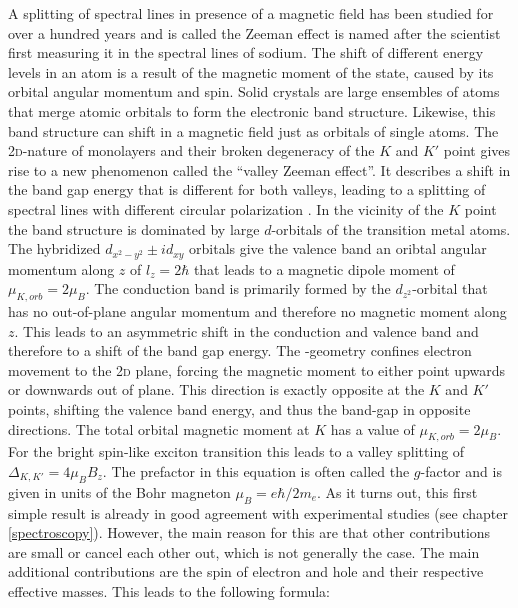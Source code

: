 A splitting of spectral lines in presence of a magnetic field has been studied for over a hundred years and is called the Zeeman effect is named after the scientist first measuring it in the spectral lines of sodium. The shift of different energy levels in an atom is a result of the magnetic moment of the state, caused by its orbital angular momentum and spin. Solid crystals are large ensembles of atoms that merge atomic orbitals to form the electronic band structure. Likewise, this band structure can shift in a magnetic field just as orbitals of single atoms. The 2\textsc{d}-nature of \tmdg monolayers and their broken degeneracy of the $K$ and $K'$ point gives rise to a new phenomenon called the ``valley Zeeman effect''. It describes a shift in the band gap energy that is different for both valleys, leading to a splitting of spectral lines with different circular polarization \cite{srivastava_valley_2015, aivazian_magnetic_2015}. In the vicinity of the $K$ point the band structure is dominated by large $d$-orbitals of the transition metal atoms. The hybridized $d_{x^2-y^2} \pm id_{xy}$ orbitals give the valence band an oribtal angular momentum along $z$ of $l_z=2\hbar$ that leads to a magnetic dipole moment of $\mu_{K,orb}=2\mu_B$. The conduction band is primarily formed by the $d_{z^2}$-orbital that has no out-of-plane angular momentum and therefore no magnetic moment along $z$. This leads to an asymmetric shift in the conduction and valence band and therefore to a shift of the band gap energy. The \tmd-geometry confines electron movement to the 2\textsc{d} plane, forcing the magnetic moment to either point upwards or downwards out of plane. This direction is exactly opposite at the $K$ and $K'$ points, shifting the valence band energy, and thus the band-gap in opposite directions. The total orbital magnetic moment at $K$ has a value of $\mu_{K,orb}=2\mu_B$. For the bright spin-like exciton transition this leads to a valley splitting of $\Delta_{K,K'}=4\mu_BB_z$. The prefactor in this equation is often called the $g$-factor and is given in units of the Bohr magneton $\mu_B=e\hbar/2m_e$. As it turns out, this first simple result is already in good agreement with experimental studies (see chapter \ref{spectroscopy}). However, the main reason for this are that other contributions are small or cancel each other out, which is not generally the case. The main additional contributions are the spin of electron and hole and their respective effective masses. %
This leads to the following formula:

